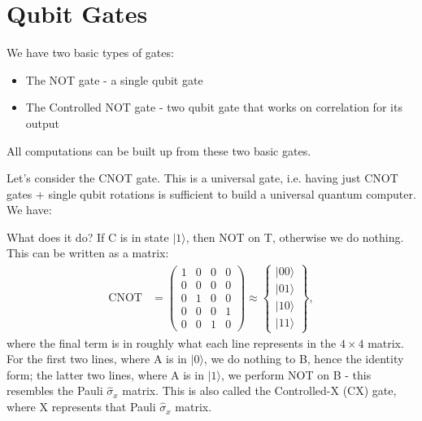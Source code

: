 \documentclass[lasers.tex]{subfiles}
\begin{document}
\section{Qubit Gates}
We have two basic types of gates:
\begin{itemize}
    \item The NOT gate - a single qubit gate
    \item The Controlled NOT gate - two qubit gate that works on correlation for its output
\end{itemize}
All computations can be built up from these two basic gates.

Let's consider the CNOT gate.
This is a universal gate, i.e. having just CNOT gates $+$ single qubit rotations is sufficient to build a universal quantum computer. 
We have:
\begin{figure}[H]
    \centering
\end{figure}
What does it do?
If C is in state $|1\rangle$, then NOT on T, otherwise we do nothing. 
This can be written as a matrix:
\begin{align}
    \text{CNOT} &= \begin{pmatrix} 1 & 0 & 0 & 0 \\ 0 & 0 & 0 & 0 \\ 0 & 1 & 0 & 0 \\ 0 & 0 & 0 & 1 \\ 0 & 0 & 1 & 0 \end{pmatrix} \approx \begin{Bmatrix} |00\rangle \\ |01\rangle \\ |10\rangle \\ |11\rangle\end{Bmatrix},
\end{align}
where the final term is in roughly what each line represents in the $4\times4$ matrix. 
For the first two lines, where A is in $|0\rangle$, we do nothing to B, hence the identity form; the latter two lines, where A is in $|1\rangle$, we perform NOT on B - this resembles the Pauli $\hat{\sigma}_x$ matrix. 
This is also called the Controlled-X (CX) gate, where X represents that Pauli $\hat{\sigma}_x$ matrix. 
\end{document}
